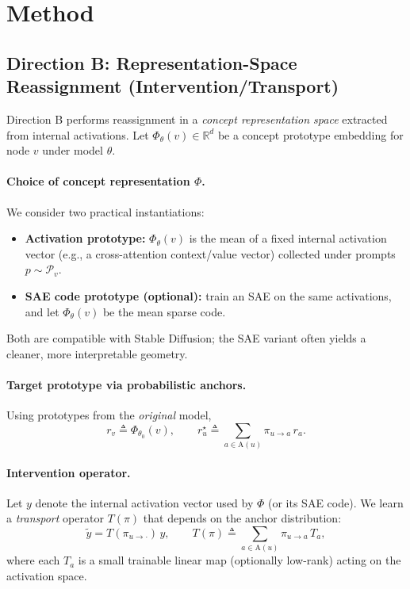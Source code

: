 \section{Method}
\label{sec:method}

\subsection{Direction B: Representation-Space Reassignment (Intervention/Transport)}
\label{sec:dirB}

Direction B performs reassignment in a \emph{concept representation space} extracted from internal activations.
Let $\Phi_{\theta}(v)\in\mathbb{R}^{d}$ be a concept prototype embedding for node $v$ under model $\theta$.

\paragraph{Choice of concept representation $\Phi$.}
We consider two practical instantiations:
\begin{itemize}
\item \textbf{Activation prototype:} $\Phi_{\theta}(v)$ is the mean of a fixed internal activation vector (e.g., a cross-attention context/value vector) collected under prompts $p\sim\mathcal{P}_v$.
\item \textbf{SAE code prototype (optional):} train an SAE on the same activations, and let $\Phi_{\theta}(v)$ be the mean sparse code.
\end{itemize}
Both are compatible with Stable Diffusion; the SAE variant often yields a cleaner, more interpretable geometry.

\paragraph{Target prototype via probabilistic anchors.}
Using prototypes from the \emph{original} model,
\begin{equation}
r_v \triangleq \Phi_{\theta_0}(v),
\qquad
r_u^{\star} \triangleq \sum_{a\in\mathrm{A}(u)} \pi_{u\rightarrow a}\, r_a.
\label{eq:target-proto}
\end{equation}

\paragraph{Intervention operator.}
Let $y$ denote the internal activation vector used by $\Phi$ (or its SAE code).
We learn a \emph{transport} operator $T(\pi)$ that depends on the anchor distribution:
\begin{equation}
\tilde{y} = T(\pi_{u\rightarrow \cdot})\, y,
\qquad
T(\pi) \triangleq \sum_{a\in\mathrm{A}(u)} \pi_{u\rightarrow a}\, T_a,
\label{eq:transport}
\end{equation}
where each $T_a$ is a small trainable linear map (optionally low-rank) acting on the activation space.

